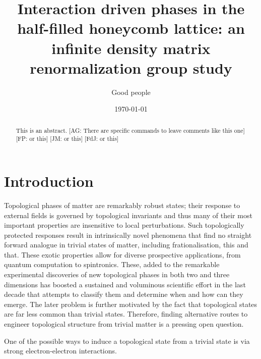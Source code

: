 \documentclass[aps,prx,10pt,twocolumn,floatfix,superscriptaddress,showpacs,numerical,footinbib]{revtex4-1}
\newcommand{\noteAG}[1]{{\color{blue} [AG: #1]}}
\newcommand{\noteFP}[1]{{\color{magenta} [FP: #1]}}
\newcommand{\noteJM}[1]{{\color{red} [JM: #1]}}
\newcommand{\noteFdJ}[1]{{\color{cyan} [FdJ: #1]}}
\begin{document}
%
\title{Interaction driven phases in the half-filled honeycomb lattice: an infinite density matrix renormalization group study}
%
\author{Good people}
%
\date{\today}
%
\begin{abstract}
%
This is an abstract.
%
\noteAG{There are specific commands to leave comments like this one}\noteFP{or this}\noteJM{or this}\noteFdJ{or this}
%
\end{abstract}
%
\maketitle
%

\section{Introduction}
%
Topological phases of matter are remarkably robust states; their response to external fields is
governed by topological invariants and thus many of their most important properties are insensitive to local perturbations.
%
Such topologically protected responses result in intrinsically novel phenomena that find no straight forward analogue in trivial states
of matter, including frationalisation, this and that.
%
These exotic properties allow for diverse prospective applications, from quantum computation to spintronics.
%
These, added to the remarkable experimental discoveries of new topological phases in both two and three dimensions 
has boosted a sustained and voluminous scientific effort in the last decade that attempts to classify them and determine when and how can they emerge.
%
The later problem is further motivated by the fact that topological states are far less common than trivial states.
%
Therefore, finding alternative routes to engineer topological structure from trivial matter is a pressing open question.
%

One of the possible ways to induce a topological state from a trivial state is via strong electron-electron interactions.
%


%
%
%
%
%
\end{document}
